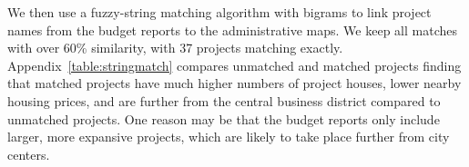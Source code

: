 \documentclass[12pt]{article}
\begin{document}




We then use a fuzzy-string matching algorithm with bigrams to link project names from the budget reports to the administrative maps.  We keep all matches with over 60\% similarity, with 37 projects matching exactly.  Appendix~\ref{table:stringmatch} compares unmatched and matched projects finding that matched projects have much higher numbers of project houses, lower nearby housing prices, and are further from the central business district compared to unmatched projects.  One reason may be that the budget reports only include larger, more expansive projects, which are likely to take place further from city centers. 


\end{document}
